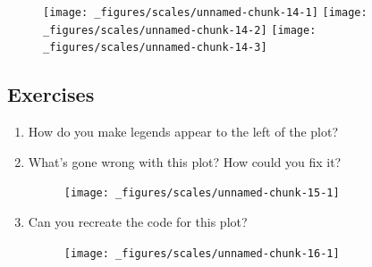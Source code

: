 \begin{Shaded}
\begin{Highlighting}[]
\StringTok{ }\NormalTok{(} \NormalTok{, } \NormalTok{:}\NormalTok{, } \NormalTok{:}\NormalTok{)}
\StringTok{ }\StringTok{ }\NormalTok{(}\NormalTok{(} 

\StringTok{ }\NormalTok{(} \NormalTok{(} \NormalTok{))}
\StringTok{ }\NormalTok{(} \NormalTok{(} \NormalTok{(}\NormalTok{, }\NormalTok{)))}
\end{Highlighting}
\end{Shaded}

\begin{figure}[H]
  \texttt{[image: \_figures/scales/unnamed-chunk-14-1]}%
  \texttt{[image: \_figures/scales/unnamed-chunk-14-2]}%
  \texttt{[image: \_figures/scales/unnamed-chunk-14-3]}
\end{figure}

\subsection{Exercises}\label{exercises-2}

\begin{enumerate}
\def\labelenumi{\arabic{enumi}.}
\item
  How do you make legends appear to the left of the plot?
\item
  What's gone wrong with this plot? How could you fix it?

\begin{Shaded}
\begin{Highlighting}[]
\StringTok{ }
\StringTok{  }\NormalTok{(}\NormalTok{(}  \StringTok{ }
\StringTok{  }\NormalTok{(}\NormalTok{)}
\end{Highlighting}
\end{Shaded}

  \begin{figure}[H]
    \centering
    \texttt{[image: \_figures/scales/unnamed-chunk-15-1]}
  \end{figure}
\item
  Can you recreate the code for this plot?

  \begin{figure}[H]
    \centering
    \texttt{[image: \_figures/scales/unnamed-chunk-16-1]}
  \end{figure}
\end{enumerate}

